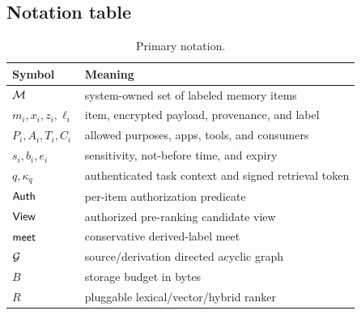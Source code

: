 \subsection{Notation table}

\begin{table}[t]
\centering
\caption{Primary notation.}
\label{tab:notation}
\small
\begin{tabularx}{\linewidth}{lX}
\toprule
Symbol & Meaning \\
\midrule
$\mathcal{M}$ & system-owned set of labeled memory items \\
$m_i,x_i,z_i,\ell_i$ & item, encrypted payload, provenance, and label \\
$P_i,A_i,T_i,C_i$ & allowed purposes, apps, tools, and consumers \\
$s_i,b_i,e_i$ & sensitivity, not-before time, and expiry \\
$q,\kappa_q$ & authenticated task context and signed retrieval token \\
$\mathsf{Auth}$ & per-item authorization predicate \\
$\mathsf{View}$ & authorized pre-ranking candidate view \\
$\mathsf{meet}$ & conservative derived-label meet \\
$\mathcal{G}$ & source/derivation directed acyclic graph \\
$B$ & storage budget in bytes \\
$R$ & pluggable lexical/vector/hybrid ranker \\
\bottomrule
\end{tabularx}
\end{table}
